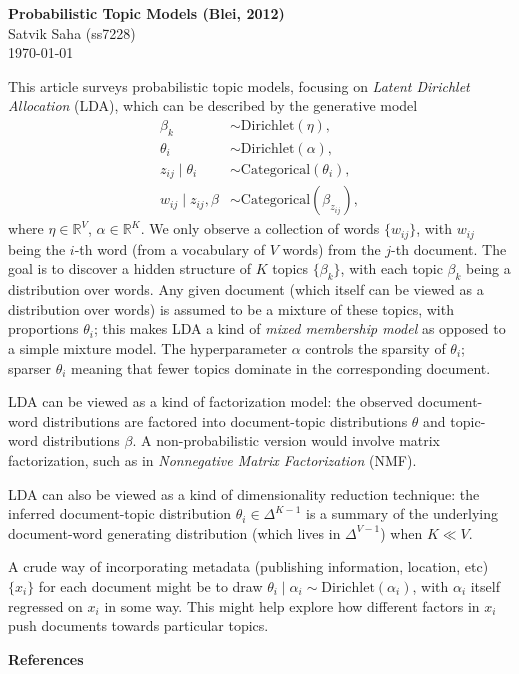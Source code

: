\documentclass[12pt]{article}
\begin{document}
\begin{flushleft}
\textbf{Probabilistic Topic Models (Blei, 2012)} \\
Satvik Saha (ss7228) \\
\today
\end{flushleft}

\vspace{0.1in}

This article surveys probabilistic topic models, focusing on \emph{Latent
Dirichlet Allocation} (LDA), which can be described by the generative model
\begin{align*}
    \beta_k &\sim \text{Dirichlet}(\eta), \\
    \theta_i &\sim \text{Dirichlet}(\alpha), \\
    z_{ij}\mid \theta_i &\sim \text{Categorical}(\theta_i), \\
    w_{ij}\mid z_{ij}, \beta &\sim \text{Categorical}(\beta_{z_{ij}}),
\end{align*}
where $\eta \in \mathbb{R}^V$, $\alpha \in \mathbb{R}^K$.
We only observe a collection of words $\{w_{ij}\}$, with $w_{ij}$ being the
$i$-th word (from a vocabulary of $V$ words) from the $j$-th document.
The goal is to discover a hidden structure of $K$ topics $\{\beta_k\}$, with
each topic $\beta_k$ being a distribution over words.
Any given document (which itself can be viewed as a distribution over words) is
assumed to be a mixture of these topics, with proportions $\theta_i$; this
makes LDA a kind of \emph{mixed membership model} as opposed to a simple
mixture model.
The hyperparameter $\alpha$ controls the sparsity of $\theta_i$; sparser
$\theta_i$ meaning that fewer topics dominate in the corresponding document.

LDA can be viewed as a kind of factorization model: the observed document-word
distributions are factored into document-topic distributions $\theta$ and
topic-word distributions $\beta$.
A non-probabilistic version would involve matrix factorization, such as in
\emph{Nonnegative Matrix Factorization} (NMF).

LDA can also be viewed as a kind of dimensionality reduction technique: the
inferred document-topic distribution $\theta_i \in \Delta^{K - 1}$ is a summary
of the underlying document-word generating distribution (which lives in
$\Delta^{V - 1}$) when $K \ll V$.

A crude way of incorporating metadata (publishing information, location, etc)
$\{x_i\}$ for each document might be to draw $\theta_i \mid \alpha_i \sim
\text{Dirichlet}(\alpha_i)$, with $\alpha_i$ itself regressed on $x_i$ in some
way.
This might help explore how different factors in $x_i$ push documents towards
particular topics.



\nocite{*}


\vfill

\begingroup
\renewcommand{\section}[2]{}%
\textbf{References}

\endgroup
\end{document}
